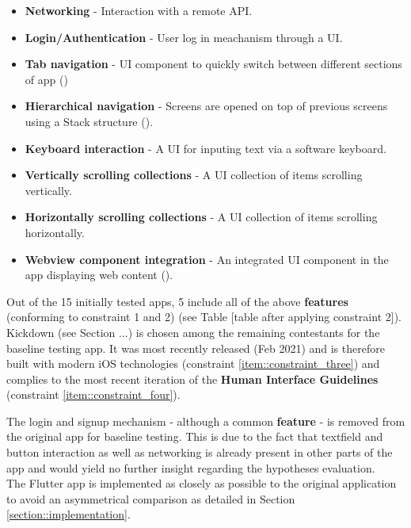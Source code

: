 \begin{itemize}
    \item \textbf{Networking} - Interaction with a remote API.
    \item \textbf{Login/Authentication} - User log in meachanism through a UI.
    \item \textbf{Tab navigation} - UI component to quickly switch between different sections of app (\cite{AppleHIGTabBar2021})
    \item \textbf{Hierarchical navigation} - Screens are opened on top of previous screens using a Stack structure (\cite{AppleHIGNavigation2021}).
    \item \textbf{Keyboard interaction} - A UI for inputing text via a software keyboard.
    \item \textbf{Vertically scrolling collections} - A UI collection of items scrolling vertically.
    \item \textbf{Horizontally scrolling collections} - A UI collection of items scrolling horizontally.
    \item \textbf{Webview component integration} - An integrated UI component in the app displaying web content (\cite{AppleHIGWebViews2021}).
\end{itemize}

Out of the 15 initially tested apps, 5 include all of the above \textbf{features} (conforming to
constraint 1 and 2) (see Table [table after applying constraint 2]). Kickdown (see Section ...) is chosen among the remaining 
contestants for the baseline testing app. It was most recently released (Feb 2021) and is therefore built with modern iOS technologies (constraint \ref{item::constraint_three})
and complies to the most recent iteration of the \textbf{Human Interface Guidelines} (constraint \ref{item::constraint_four}).



The login and signup mechanism - although a common \textbf{feature} - is removed from the original
app for baseline testing. This is due to the fact that textfield and button interaction as well
as networking is already present in other parts of the app and would yield no further insight
regarding the hypotheses evaluation.\\
The Flutter app is implemented as closely as possible to the original application to avoid an
asymmetrical comparison as detailed in Section \ref{section::implementation}.

